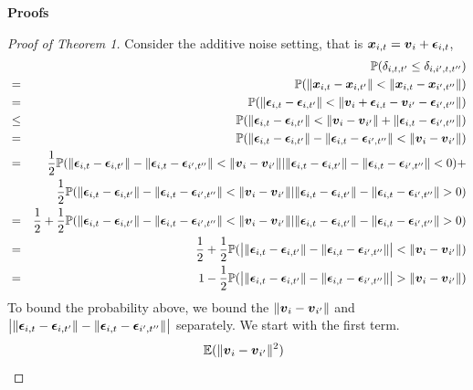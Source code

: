 \documentclass{article}
\begin{document}
\appendix
\noindent\bf{Proofs}
\begin{proof}[Proof of Theorem 1]
	Consider the additive noise setting, that is $\boldsymbol{x}_{i,t}=\boldsymbol{v}_{i} + \boldsymbol{\epsilon}_{i,t}$,  
	\begin{eqnarray*}
		& &\PP(\delta_{i,t,t'} \leq \delta_{i,i',t,t''}) \\
		&=&\PP(\|\bx_{i,t}-\bx_{i,t'}\|<\|\bx_{i,t}-\bx_{i',t''}\|) \\
		&=&\PP(\|\mb{\epsilon}_{i,t}-\mb{\epsilon}_{i,t'}\| < \|\bv_{i}+\mb{\epsilon}_{i,t}-\bv_{i'}-\mb{\epsilon}_{i',t''}\|) \\
		&\leq&\PP(\|\mb{\epsilon}_{i,t}-\mb{\epsilon}_{i,t'}\| < \|\bv_{i}-\bv_{i'}\| + \|\mb{\epsilon}_{i,t}-\mb{\epsilon}_{i',t''}\|) \\
		&=& \PP(\|\mb{\epsilon}_{i,t}-\mb{\epsilon}_{i,t'}\|-\|\mb{\epsilon}_{i,t}-\mb{\epsilon}_{i',t''}\|< \|\bv_{i}-\bv_{i'}\|) \\
		&=& \frac{1}{2}\PP(\|\mb{\epsilon}_{i,t}-\mb{\epsilon}_{i,t'}\|-\|\mb{\epsilon}_{i,t}-\mb{\epsilon}_{i',t''}\|< \|\bv_{i}-\bv_{i'}\||\|\mb{\epsilon}_{i,t}-\mb{\epsilon}_{i,t'}\|-\|\mb{\epsilon}_{i,t}-\mb{\epsilon}_{i',t''}\|<0) + \\ 
		& &\frac{1}{2}\PP(\|\mb{\epsilon}_{i,t}-\mb{\epsilon}_{i,t'}\|-\|\mb{\epsilon}_{i,t}-\mb{\epsilon}_{i',t''}\|< \|\bv_{i}-\bv_{i'}\||\|\mb{\epsilon}_{i,t}-\mb{\epsilon}_{i,t'}\|-\|\mb{\epsilon}_{i,t}-\mb{\epsilon}_{i',t''}\|>0) \\
		&=&\frac{1}{2} + \frac{1}{2}\PP(\|\mb{\epsilon}_{i,t}-\mb{\epsilon}_{i,t'}\|-\|\mb{\epsilon}_{i,t}-\mb{\epsilon}_{i',t''}\|< \|\bv_{i}-\bv_{i'}\||\|\mb{\epsilon}_{i,t}-\mb{\epsilon}_{i,t'}\|-\|\mb{\epsilon}_{i,t}-\mb{\epsilon}_{i',t''}\|>0) \\
		&=& \frac{1}{2} + \frac{1}{2}\PP(\big| \|\mb{\epsilon}_{i,t}-\mb{\epsilon}_{i,t'}\|-\|\mb{\epsilon}_{i,t}-\mb{\epsilon}_{i',t''}\| \big|< \|\bv_{i}-\bv_{i'}\|)\\
		&=& 1 - \frac{1}{2} \PP(\big| \|\mb{\epsilon}_{i,t}-\mb{\epsilon}_{i,t'}\|-\|\mb{\epsilon}_{i,t}-\mb{\epsilon}_{i',t''}\| \big|> \|\bv_{i}-\bv_{i'}\|)\\
	\end{eqnarray*}
	To bound the probability above, we bound the $\|\boldsymbol{v}_{i}-\boldsymbol{v}_{i'}\|$ and $\big| \|\boldsymbol{\epsilon}_{i,t}-\boldsymbol{\epsilon}_{i,t'}\|-\|\boldsymbol{\epsilon}_{i,t}-\boldsymbol{\epsilon}_{i',t''}\| \big|$ separately. We start with the first term.
	\begin{eqnarray*}
		& &\EE(\|\bv_{i}-\bv_{i'}\|^2) \\

\end{eqnarray*}
\end{proof}
\end{document}
